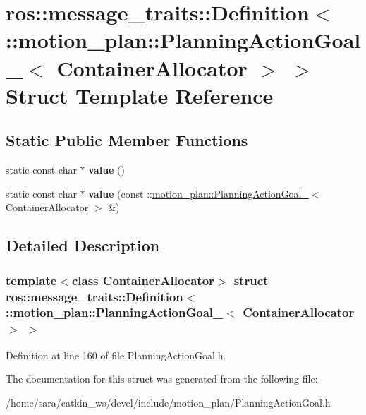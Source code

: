 \hypertarget{structros_1_1message__traits_1_1Definition_3_01_1_1motion__plan_1_1PlanningActionGoal___3_01ContainerAllocator_01_4_01_4}{}\section{ros\+:\+:message\+\_\+traits\+:\+:Definition$<$ \+:\+:motion\+\_\+plan\+:\+:Planning\+Action\+Goal\+\_\+$<$ Container\+Allocator $>$ $>$ Struct Template Reference}
\label{structros_1_1message__traits_1_1Definition_3_01_1_1motion__plan_1_1PlanningActionGoal___3_01ContainerAllocator_01_4_01_4}
\subsection*{Static Public Member Functions}
\begin{DoxyCompactItemize}
\item 
\mbox{\label{structros_1_1message__traits_1_1Definition_3_01_1_1motion__plan_1_1PlanningActionGoal___3_01ContainerAllocator_01_4_01_4_ae84342ec581bf202787a35aacc5288b8}} 
static const char $\ast$ {\bfseries value} ()
\item 
\mbox{\label{structros_1_1message__traits_1_1Definition_3_01_1_1motion__plan_1_1PlanningActionGoal___3_01ContainerAllocator_01_4_01_4_a168c124c04aba29a4243d504248b62cd}} 
static const char $\ast$ {\bfseries value} (const \+::\hyperlink{structmotion__plan_1_1PlanningActionGoal__}{motion\+\_\+plan\+::\+Planning\+Action\+Goal\+\_\+}$<$ Container\+Allocator $>$ \&)
\end{DoxyCompactItemize}


\subsection{Detailed Description}
\subsubsection*{template$<$class Container\+Allocator$>$\newline
struct ros\+::message\+\_\+traits\+::\+Definition$<$ \+::motion\+\_\+plan\+::\+Planning\+Action\+Goal\+\_\+$<$ Container\+Allocator $>$ $>$}



Definition at line 160 of file Planning\+Action\+Goal.\+h.



The documentation for this struct was generated from the following file\+:\begin{DoxyCompactItemize}
\item 
/home/sara/catkin\+\_\+ws/devel/include/motion\+\_\+plan/Planning\+Action\+Goal.\+h\end{DoxyCompactItemize}
